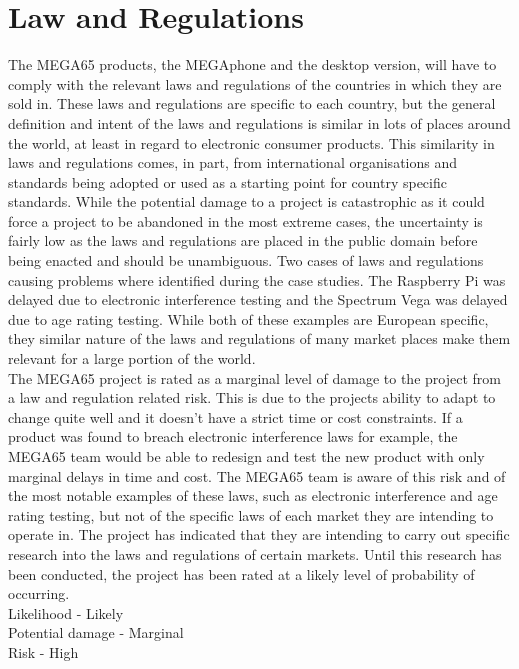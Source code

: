 \section{Law and Regulations}
The MEGA65 products, the MEGAphone and the desktop version, will have to comply with the relevant laws and regulations of the countries in which they are sold in. These laws and regulations are specific to each country, but the general definition and intent of the laws and regulations is similar in lots of places around the world, at least in regard to electronic consumer products. This similarity in laws and regulations comes, in part, from international organisations and standards being adopted or used as a starting point for country specific standards. While the potential damage to a project is catastrophic as it could force a project to be abandoned in the most extreme cases, the uncertainty is fairly low as the laws and regulations are placed in the public domain before being enacted and should be unambiguous. Two cases of laws and regulations causing problems where identified during the case studies. The Raspberry Pi was delayed due to electronic interference testing and the Spectrum Vega was delayed due to age rating testing. While both of these examples are European specific, they similar nature of the laws and regulations of many market places make them relevant for a large portion of the world. \\

The MEGA65 project is rated as a marginal level of damage to the project from a law and regulation related risk. This is due to the projects ability to adapt to change quite well and it doesn't have a strict time or cost constraints. If a product was found to breach electronic interference laws for example, the MEGA65 team would be able to redesign and test the new product with only marginal delays in time and cost. The MEGA65 team is aware of this risk and of the most notable examples of these laws, such as electronic interference and age rating testing, but not of the specific laws of each market they are intending to operate in. The project has indicated that they are intending to carry out specific research into the laws and regulations of certain markets. Until this research has been conducted, the project has been rated at a likely level of probability of occurring.  \\

Likelihood - Likely   \\
Potential damage - Marginal \\
Risk - High \\



